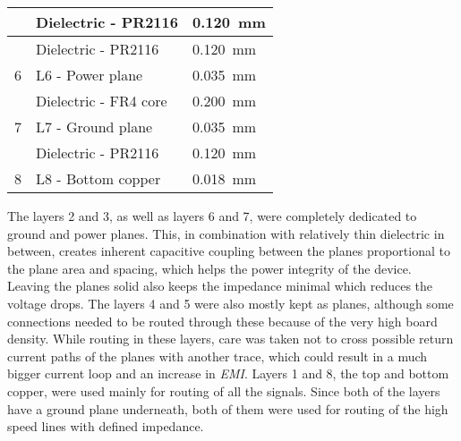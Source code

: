 \begin{table}[htp!]
\begin{tabular}{|l|l|l|}
                                         & Dielectric - PR2116                & \SI{0.120}{\milli\meter}                                   \\ \hline
                                         & Dielectric - PR2116                & \SI{0.120}{\milli\meter}                                   \\ \hline
    6                                    & L6 - Power plane                   & \SI{0.035}{\milli\meter}                                   \\ \hline
                                         & Dielectric - FR4 core              & \SI{0.200}{\milli\meter}                                   \\ \hline
    7                                    & L7 - Ground plane                  & \SI{0.035}{\milli\meter}                                   \\ \hline
                                         & Dielectric - PR2116                & \SI{0.120}{\milli\meter}                                   \\ \hline
    8                                    & L8 - Bottom copper                 & \SI{0.018}{\milli\meter}                                   \\ \hline
    \end{tabular}
    \label{tab:stackup}
\end{table}
\FloatBarrier
The layers 2 and 3, as well as layers 6 and 7, were completely dedicated to ground and power planes. This, in combination with relatively thin dielectric in between, creates inherent capacitive coupling between the planes proportional to the plane area and spacing, which helps the power integrity of the device. %
%
%
Leaving the planes solid also keeps the impedance minimal which reduces the voltage drops. The layers 4 and 5 were also mostly kept as planes, although some connections needed to be routed through these because of the very high board density. While routing in these layers, care was taken not to cross possible return current paths of the planes with another trace, which could result in a much bigger current loop and an increase in \emph{EMI}. Layers 1 and 8, the top and bottom copper, were used mainly for routing of all the signals. Since both of the layers have a ground plane underneath, both of them were used for routing of the high speed lines with defined impedance. 
%
